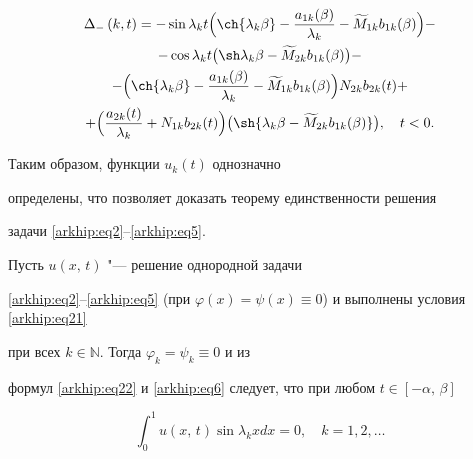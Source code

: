 \begin{multline*}

{\Delta_{-}\left({k, t}\right)} = -\sin{\lambda_{k}t}

\Bigl(\ch{\lambda_{k}\beta} - \frac{a_{1k} (\beta)}{\lambda_{k}} - \widetilde M_{1 k}b_{1 k}(\beta)\Bigr) -

\\

-

 \cos{\lambda_{k}t}\bigl(\sh\lambda_{k}\beta - \widetilde M_{2 k}b_{1 k}(\beta)\bigr)-

\\

- \Bigl(\ch{\lambda_{k} \beta} - \frac{a_{1k} (\beta)}{\lambda_{k}} - \widetilde M_{1 k}b_{1 k}(\beta)\Bigr)N_{2 k}b_{2 k}(t) +

\\

+ \Bigl( \frac{a_{2k} (t)}{\lambda_{k}} + N_{1 k}b_{2 k}(t)\Bigr)\bigl(\sh{\lambda_{k} \beta - \widetilde M_{2 k}b_{1 k}(\beta)}\bigr),\quad t < 0.

\end{multline*}




Таким образом, функции $u_{k}(t)$ однозначно

определены, что позволяет доказать теорему единственности решения

задачи \eqref{arkhip:eq2}--\eqref{arkhip:eq5}.



Пусть $u\left({x,\,t}\right)$ "--- решение однородной задачи

\eqref{arkhip:eq2}--\eqref{arkhip:eq5} (при $\varphi( x ) =

\psi( x ) \equiv{0}$) и выполнены условия \eqref{arkhip:eq21}

при всех $k\in{\mathbb  N}$. Тогда $\varphi_{k} = \psi_{k} \equiv{0}$ и из

формул \eqref{arkhip:eq22} и \eqref{arkhip:eq6} следует, что при любом $t \in

{\left[{-\alpha,\,\beta}\right]}$

\begin{equation} \label{arkhip:eq23'}

\int_0^1 u\left( {x,\,t}\right)\sin {\lambda_{k}x}dx = 0

,\quad k = 1, 2,\dots 

\end{equation}

